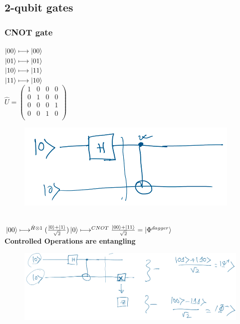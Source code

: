 \documentclass[11.5pt, paper=a4]{article}
\theoremstyle{definition}
\numberwithin{theorem}{section}
\begin{document}
\subsection{2-qubit gates}
\subsubsection{CNOT gate}
$\ket{00} \longmapsto \ket{00}$ \\
$\ket{01} \longmapsto \ket{01}$ \\
$\ket{10} \longmapsto \ket{11}$ \\
$\ket{11} \longmapsto \ket{10}$ \\
$ \hat{U} = \begin{pmatrix}
1 & 0 & 0 & 0 \\
0 & 1 & 0 & 0 \\
0 & 0 & 0 & 1 \\
0 & 0 & 1 & 0 \\
\end{pmatrix} $
\begin{figure}[h]
    \centering
    \includegraphics[scale=0.5]{CNOT gate.png}
\end{figure}\\
$\ket{00} \longmapsto^{\hat{H} \otimes 1} (\frac{\ket{0} + \ket{1}}{\sqrt{2}})\ket{0}  \longmapsto^{CNOT} \frac{\ket{00}+\ket{11}}{\sqrt{2}} = \ket{\Phi^{dagger}}$ \\
\newpage
\textbf{Controlled Operations are entangling}
\begin{figure}[h]
    \centering
    \includegraphics[scale=0.4]{entangling.png}
\end{figure}\\
\end{document}
